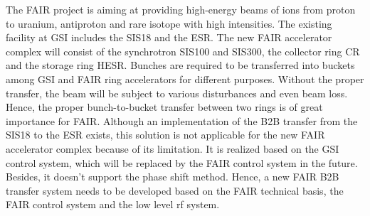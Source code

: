 The FAIR project is aiming at providing high-energy beams of ions from proton to uranium, antiproton and rare isotope with high intensities. The existing facility at GSI includes the SIS18 and the ESR. The new FAIR accelerator complex will consist of the synchrotron SIS100 and SIS300, the collector ring CR and the storage ring HESR. Bunches are required to be transferred into buckets among GSI and FAIR ring accelerators for different purposes. Without the proper transfer, the beam will be subject to various disturbances and even beam loss. Hence, the proper bunch-to-bucket transfer between two rings is of great importance for FAIR. Although an implementation of the B2B transfer from the SIS18 to the ESR exists, this solution is not applicable for the new FAIR accelerator complex because of its limitation. It is realized based on the GSI control system, which will be replaced by the FAIR control system in the future. Besides, it doesn't support the phase shift method. Hence, a new FAIR B2B transfer system needs to be developed based on the FAIR technical basis, the FAIR control system and the low level rf system.




